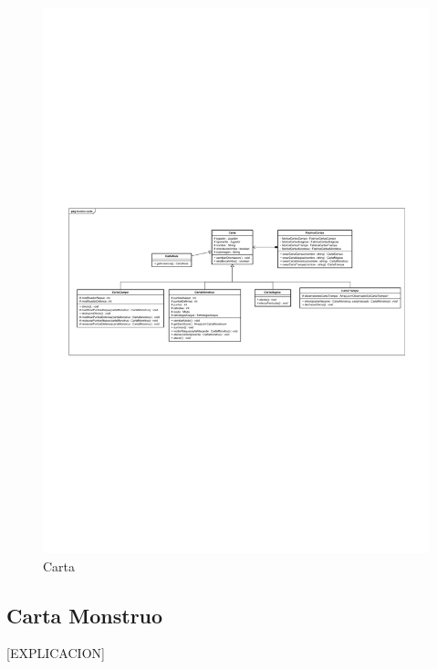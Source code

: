 \begin{figure}[H]
	\centering
	\includegraphics[scale=0.8]{includes/class_Carta}
	\caption{Carta}
	\label{class_Carta}
\end{figure}

\subsection{Carta Monstruo}

[EXPLICACION]

